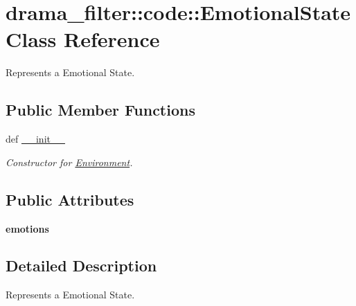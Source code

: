 \hypertarget{classdrama__filter_1_1code_1_1EmotionalState}{
\section{drama\_\-filter::code::EmotionalState Class Reference}
\label{classdrama__filter_1_1code_1_1EmotionalState}
}


Represents a Emotional State.  


\subsection*{Public Member Functions}
\begin{DoxyCompactItemize}
\item 
def \hyperlink{classdrama__filter_1_1code_1_1EmotionalState_a475d5eefe309d98c3191038504d8a846}{\_\-\_\-init\_\-\_\-}
\begin{DoxyCompactList}\small\item\em Constructor for \hyperlink{classdrama__filter_1_1code_1_1Environment}{Environment}. \end{DoxyCompactList}\end{DoxyCompactItemize}
\subsection*{Public Attributes}
\begin{DoxyCompactItemize}
\item 
\hypertarget{classdrama__filter_1_1code_1_1EmotionalState_a8f50ff7ebad98bf9f6c84d8850abba11}{
{\bfseries emotions}}
\label{classdrama__filter_1_1code_1_1EmotionalState_a8f50ff7ebad98bf9f6c84d8850abba11}

\end{DoxyCompactItemize}


\subsection{Detailed Description}
Represents a Emotional State. 

